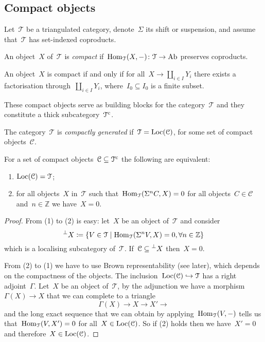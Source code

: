 \documentclass[10pt,a4paper]{article}
\begin{document}
\subsection{Compact objects}
Let~$\mathcal{T}$ be a triangulated category, denote~$\Sigma$ its shift or suspension, and assume that~$\mathcal{T}$ has set-indexed coproducts.
\begin{definition}
  An object~$X$ of~$\mathcal{T}$ is \emph{compact} if~$\operatorname{Hom}_{\mathcal{T}}(X,-)\colon\mathcal{T}\to\mathrm{Ab}$ preserves coproducts.
\end{definition}
\begin{lemma}
  An object~$X$ is compact if and only if for all~$X\to\coprod_{i\in I}Y_i$ there exists a factorisation through~$\coprod_{i\in I}Y_i$, where~$I_0\subseteq I_0$ is a finite subset.
\end{lemma}
\begin{remark}
  These compact objects serve as building blocks for the category~$\mathcal{T}$ and they constitute a thick subcategory~$\mathcal{T}^{\mathrm{c}}$.
\end{remark}
\begin{definition}
  The category~$\mathcal{T}$ is \emph{compactly generated} if~$\mathcal{T}=\operatorname{Loc}(\mathcal{C})$, for some set of compact objects~$\mathcal{C}$.
\end{definition}
\begin{proposition}
  For a set of compact objects~$\mathcal{C}\subseteq\mathcal{T}^{\mathrm{c}}$ the following are equivalent:
  \begin{enumerate}
    \item $\operatorname{Loc}(\mathcal{C})=\mathcal{T}$;
    \item for all objects~$X$ in~$\mathcal{T}$ such that~$\operatorname{Hom}_{\mathcal{T}}(\Sigma^nC,X)=0$ for all objects~$C\in\mathcal{C}$ and~$n\in\mathbb{Z}$ we have~$X=0$.
  \end{enumerate}

  \begin{proof}
    From (1) to (2) is easy: let~$X$ be an object of~$\mathcal{T}$ and consider
    \begin{equation}
      \prescript{\perp}{}{X}\coloneqq\left\{ V\in\mathcal{T}\mid\operatorname{Hom}_{\mathcal{T}}(\Sigma^nV,X)=0,\forall n\in\mathbb{Z} \right\}
    \end{equation}
    which is a localising subcategory of~$\mathcal{T}$. If~$\mathcal{C}\subseteq\prescript{\perp}{}{X}$ then~$X=0$.

    From (2) to (1) we have to use Brown representability (see later), which depends on the compactness of the objects. The inclusion~$\operatorname{Loc}(\mathcal{C})\hookrightarrow\mathcal{T}$ has a right adjoint~$\Gamma$. Let~$X$ be an object of~$\mathcal{T}$, by the adjunction we have a morphism~$\Gamma(X)\to X$ that we can complete to a triangle
    \begin{equation}
      \Gamma(X)\to X\to X'\to
    \end{equation}
    and the long exact sequence that we can obtain by applying~$\operatorname{Hom}_{\mathcal{T}}(V,-)$ tells us that~$\operatorname{Hom}_{\mathcal{T}}(V,X')=0$ for all~$X\in\operatorname{Loc}(\mathcal{C})$. So if (2) holds then we have~$X'=0$ and therefore~$X\in\operatorname{Loc}(\mathcal{C})$.%
  \end{proof}
\end{proposition}
\end{document}
